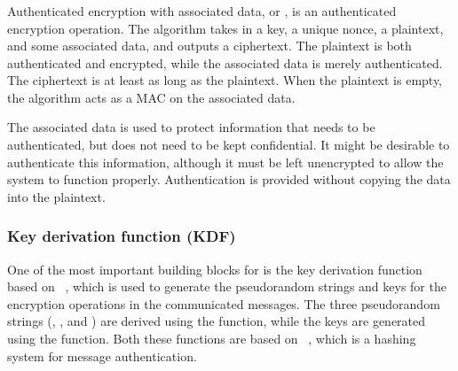 \subsubsection{\mAead}
Authenticated encryption with associated data, or \mAead, is an authenticated encryption operation. The algorithm takes in a key, a unique nonce, a plaintext, and some associated data, and outputs a ciphertext. The plaintext is both authenticated and encrypted, while the associated data is merely authenticated. The ciphertext is at least as long as the plaintext. When the plaintext is empty, the \mAead algorithm acts as a MAC on the associated data. 

The associated data is used to protect information that needs to be authenticated, but does not need to be kept confidential. It might be desirable to authenticate this information, although it must be left unencrypted to allow the system to function properly. Authentication is provided without copying the data into the plaintext.

\subsubsection{Key derivation function (KDF)}
One of the most important building blocks for \mEdhoc is the key derivation function based on \mHkdf~\cite{rfc5869}, which is used to generate the pseudorandom strings and keys for the encryption operations in the communicated messages. The three pseudorandom strings (\mPRKtwo, \mPRKthree, and \mPRKfour) are derived using the \mHkdfExtract function, while the keys  are generated using the \mHkdfExpand function. Both these functions are based on \mHmac~\cite{rfc2104}, which is a hashing system for message authentication.


